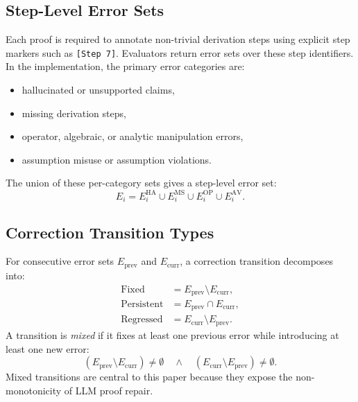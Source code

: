 \documentclass[conference]{IEEEtran}
\newcommand{\Eprev}{E_{\mathrm{prev}}}
\newcommand{\Ecurr}{E_{\mathrm{curr}}}
\begin{document}
\subsection{Step-Level Error Sets}
Each proof is required to annotate non-trivial derivation steps using explicit step markers such as \texttt{[Step 7]}. Evaluators return error sets over these step identifiers. In the implementation, the primary error categories are:
\begin{itemize}
    \item hallucinated or unsupported claims,
    \item missing derivation steps,
    \item operator, algebraic, or analytic manipulation errors,
    \item assumption misuse or assumption violations.
\end{itemize}

The union of these per-category sets gives a step-level error set:
\begin{equation}
    E_i =
    E_i^{\mathrm{HA}}
    \cup E_i^{\mathrm{MS}}
    \cup E_i^{\mathrm{OP}}
    \cup E_i^{\mathrm{AV}}.
\end{equation}

\subsection{Correction Transition Types}
For consecutive error sets $\Eprev$ and $\Ecurr$, a correction transition decomposes into:
\begin{align}
    \mathrm{Fixed} &= \Eprev \setminus \Ecurr, \\
    \mathrm{Persistent} &= \Eprev \cap \Ecurr, \\
    \mathrm{Regressed} &= \Ecurr \setminus \Eprev.
\end{align}
A transition is \emph{mixed} if it fixes at least one previous error while introducing at least one new error:
\begin{equation}
    (\Eprev \setminus \Ecurr) \neq \emptyset
    \quad \wedge \quad
    (\Ecurr \setminus \Eprev) \neq \emptyset.
\end{equation}
Mixed transitions are central to this paper because they expose the non-monotonicity of LLM proof repair.
\end{document}
